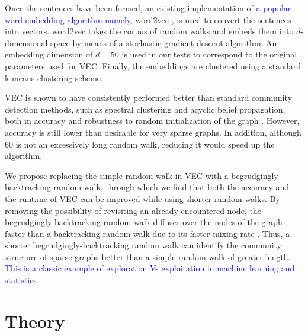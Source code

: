 \documentclass{article} %
\begin{document}

Once the sentences have been formed, an existing implementation of \textcolor{blue}{a popular word embedding algorithm namely}, word2vec \cite{word2vec}, is used to convert the sentences into vectors. word2vec takes the corpus of random walks and embeds them into $d$-dimensional space by means of a stochastic gradient descent algorithm. An embedding dimension of $d=50$ is used in our tests to correspond to the original parameters used for VEC. Finally, the embeddings are clustered using a standard k-means clustering scheme.

VEC is shown to have consistently performed better than standard community detection methods, such as spectral clustering and acyclic belief propagation, both in accuracy and robustness to random initialization of the graph \cite{NodeEmbed}. However, accuracy is still lower than desirable for very sparse graphs. In addition, although 60 is not an excessively long random walk, reducing it would speed up the algorithm.

We propose replacing the simple random walk in VEC with a begrudgingly-backtracking random walk, through which we find that both the accuracy and the runtime of VEC can be improved while using shorter random walks. By removing the possibility of revisiting an already encountered node, the begrudgingly-backtracking random walk diffuses over the nodes of the graph faster than a backtracking random walk due to its faster mixing rate \cite{Alon,NBT-Ihara}. Thus, a shorter begrudgingly-backtracking random walk can identify the community structure of sparse graphs better than a simple random walk of greater length. \textcolor{blue}{This is a classic example of exploration Vs exploitation in machine learning and statistics}.

\section{Theory}
\end{document}
